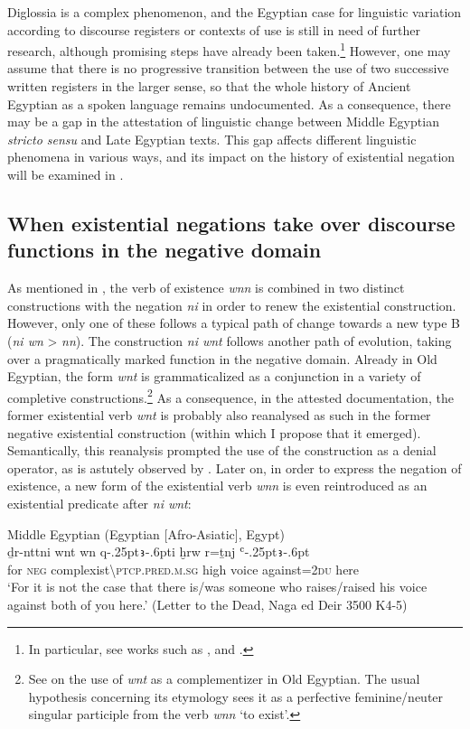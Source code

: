 \documentclass[output=paper]{langsci/langscibook}
\newcommand{\ꜥ}{ʿ}
\newcommand{\ꜣ}{\kern-.25pt\texttt{ꜣ}\kern-.6pt}
\begin{document}
Diglossia is a complex phenomenon, and the Egyptian case for linguistic variation according to discourse registers or contexts of use is still in need of further research, although promising steps have already been taken.\footnote{In particular, see works such as \citet{Stauder2014a}, \citet{Werning2013} and \citet{Polis2017}.} 
However, one may assume that there is no progressive transition between the use of two successive written registers in the larger sense, so that the whole history of Ancient Egyptian as a spoken language remains undocumented. As a consequence, there may be a gap in the attestation of linguistic change between Middle Egyptian \emph{stricto sensu} and Late Egyptian texts. This gap affects different linguistic phenomena in various ways, and its impact on the history of existential negation will be examined in .

\subsection{When existential negations take over discourse functions in the negative domain}\label{s:AE3-2}

As mentioned in , the verb of existence \textit{wnn} is combined in two distinct constructions with the negation \textit{ni} in order to renew the existential construction. However, only one of these follows a typical path of change towards a new type B (\textit{ni wn} > \textit{nn}). The construction \textit{ni wnt} follows another path of evolution, taking over a pragmatically marked function in the negative domain. Already in Old Egyptian, the form \textit{wnt} is grammaticalized as a conjunction in a variety of completive constructions.\footnote{See \citet{Uljas2007} on the use of \textit{wnt} as a complementizer in Old Egyptian. The usual hypothesis concerning its etymology sees it as a perfective feminine/neuter singular participle from the verb \textit{wnn} ‘to exist’.}
As a consequence, in the attested documentation, the former existential verb \textit{wnt} is probably also reanalysed as such in the former negative existential construction (within which I propose that it emerged). Semantically, this reanalysis prompted the use of the construction as a denial operator, as is astutely observed by \citet[192–193]{Uljas2007}. Later on, in order to express the negation of existence, a new form of the existential verb \textit{wnn} is even reintroduced as an existential predicate after \textit{ni wnt}: 
 
\ea Middle Egyptian (Egyptian [Afro-Asiatic], Egypt) \label{ex:AE47}\\
    \gll ḏr-nttni wnt wn q{\ꜣ}i ḫrw r=ṯnj {\ꜥ}{\ꜣ}\\
    for \textsc{neg} complexist\textbackslash\textsc{ptcp.pred.m.sg} high voice against=\textsc{2du} here\\ 
    \glt ‘For it is not the case that there is/was someone who raises/raised his voice against both of you here.’ (Letter to the Dead, Naga ed Deir 3500 K4-5) 
\z
 
\end{document}
